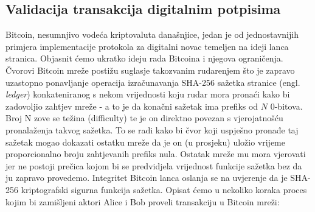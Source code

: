 \documentclass[utf8, zavrsni]{fer}
\begin{document}
\subsection{Validacija transakcija digitalnim potpisima}
Bitcoin, nesumnjivo vodeća kriptovaluta današnjice, jedan je od jednostavnijih primjera implementacije protokola za digitalni novac temeljen na ideji lanca stranica. Objasnit ćemo ukratko ideju rada Bitcoina i njegova ograničenja. Čvorovi Bitcoin mreže postižu suglasje takozvanim rudarenjem što je zapravo uzastopno ponavljanje operacija izračunavanja SHA-256 sažetka stranice (engl. \textit{ledger}) konkateniranog s nekom vrijednosti koju rudar mora pronaći kako bi zadovoljio zahtjev mreže - a to je da konačni sažetak ima prefiks od $N$ 0-bitova. Broj N zove se težina (difficulty) te je on direktno povezan s vjerojatnošću pronalaženja takvog sažetka. To se radi kako bi čvor koji uspješno pronađe taj sažetak mogao dokazati ostatku mreže da je on (u prosjeku) uložio vrijeme proporcionalno broju zahtjevanih prefiks nula. Ostatak mreže mu mora vjerovati jer ne postoji prečica kojom bi se predvidjela vrijednost funkcije sažetka bez da ju zapravo provedemo. Integritet Bitcoin lanca oslanja se na uvjerenje da je SHA-256 kriptografski sigurna funkcija sažetka. Opisat ćemo u nekoliko koraka proces kojim bi zamišljeni aktori Alice i Bob proveli transakciju u Bitcoin mreži:
\end{document}
